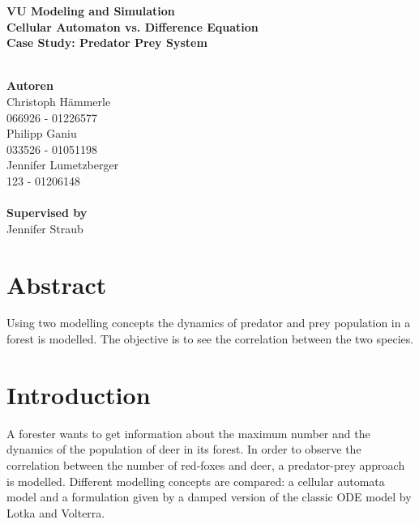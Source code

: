 \documentclass[a4paper,12pt]{article}
\date{\vspace{-10ex}}
\begin{document}
\vspace*{10mm}
\begin{center}
\huge{\textbf{VU Modeling and Simulation}} \\
\vspace{20mm}
\Large{\textbf{Cellular Automaton vs. Difference Equation}}\\
\textbf{Case Study: Predator Prey System}\\ \ \\
\begin{large}
\textbf{Autoren}\\
    	Christoph Hämmerle\\
    	066926 - 01226577\\
    	Philipp Ganiu\\
    	033526 - 01051198\\
    	Jennifer Lumetzberger\\
    	123 - 01206148\\ \ \\

\textbf{Supervised by}\\
	Jennifer Straub  	  	
\end{large}   	
\end{center}

\section*{Abstract}

Using two modelling concepts the dynamics of predator and prey population in a forest is modelled. The objective is to see the correlation
between the two species. 


\newpage
\tableofcontents
\newpage

\section{Introduction}
A forester wants to get information about the maximum number and the dynamics of the population of
deer in its forest. In order to observe the correlation between the number of red-foxes and deer, a predator-prey approach is modelled.
Different modelling concepts are compared: a cellular automata model and a formulation given by a damped version of the classic ODE model by Lotka and Volterra.\\ \ \\
\end{document}
